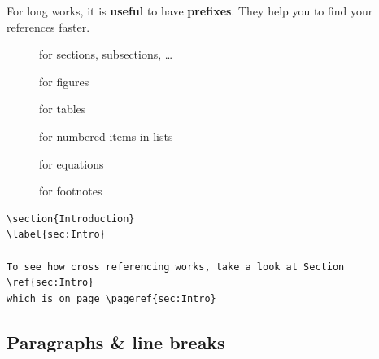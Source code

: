 \begin{frame}[fragile]

For long works, it is \textbf{useful} to have \textbf{prefixes}. They help you to find your references faster.

\begin{description}
\item[] for sections, subsections, \dots 
\item[] for figures
\item[] for tables
\item[] for numbered items in lists
\item[] for equations
\item[] for footnotes
\end{description}


\begin{lstlisting}
\section{Introduction}
\label{sec:Intro}

To see how cross referencing works, take a look at Section \ref{sec:Intro} 
which is on page \pageref{sec:Intro}
\end{lstlisting}

\end{frame}


\subsection{Paragraphs \& line breaks}

